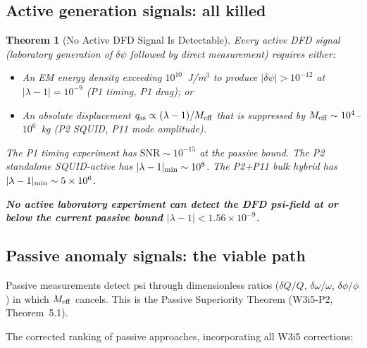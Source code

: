 \documentclass[11pt]{article}
\newcommand{\dpsi}{\delta\psi}
\newcommand{\lam}{\lambda}
\newcommand{\Meff}{M_{\rm eff}}
\newcommand{\ee}[1]{\times 10^{#1}}
\newcommand{\SNR}{\mathrm{SNR}}
\newcommand{\lbone}{|\lam - 1|}
\newtheorem{theorem}{Theorem}[section]
\theoremstyle{definition}
\theoremstyle{remark}
\begin{document}
\subsection{Active generation signals: all killed}
\label{ssec:active_killed}

\begin{theorem}[No Active DFD Signal Is Detectable]
\label{thm:active_killed}
Every active DFD signal (laboratory generation of $\dpsi$ followed by
direct measurement) requires either:
\begin{itemize}[nosep]
\item An EM energy density exceeding $10^{10}$~J/m$^3$ to produce
  $|\dpsi| > 10^{-12}$ at $\lbone = 10^{-9}$ (P1 timing, P1 drag); or
\item An absolute displacement $q_{\rm ss} \propto (\lam-1)/\Meff$
  that is suppressed by $\Meff \sim 10^{4}$--$10^{6}$~kg (P2 SQUID,
  P11 mode amplitude).
\end{itemize}

The P1 timing experiment has $\SNR \sim 10^{-15}$ at the passive bound.
The P2 standalone SQUID-active has $\lbone_{\rm min} \sim 10^{8}$.
The P2+P11 bulk hybrid has $\lbone_{\rm min} \sim 5\ee{6}$.

\textbf{No active laboratory experiment can detect the DFD psi-field
at or below the current passive bound $\lbone < 1.56\ee{-9}$.}
\end{theorem}

\subsection{Passive anomaly signals: the viable path}
\label{ssec:passive_viable}

Passive measurements detect psi through dimensionless ratios ($\delta Q/Q$,
$\delta\omega/\omega$, $\delta\phi/\phi$) in which $\Meff$ cancels.
This is the Passive Superiority Theorem (W3i5-P2, Theorem~5.1).

The corrected ranking of passive approaches, incorporating all W3i5
corrections:
\end{document}
